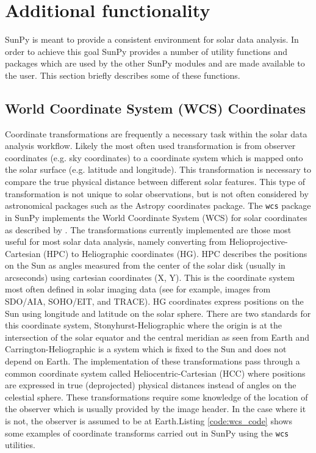 \section{Additional functionality}\label{sec:util}
SunPy is meant to provide a consistent environment for solar data analysis. In 
order to achieve this goal SunPy provides a number of utility functions and packages which 
are used by the other SunPy modules and are made available to the user. This section 
briefly describes some of these functions.

	
\subsection{World Coordinate System (WCS) Coordinates}\label{ssec:util:wcs}
Coordinate transformations are frequently a necessary task within the solar 
data analysis workflow. Likely the most often used transformation is from 
observer coordinates (e.g. sky coordinates) to a coordinate system which is 
mapped onto the solar surface (e.g. latitude and longitude). This 
transformation is necessary to compare the true physical distance between 
different solar features. This type of transformation is not unique
to solar observations, but is not often considered by astronomical packages
such as the Astropy 
coordinates package. The \verb|wcs| package in SunPy implements the World Coordinate 
System (WCS) for solar coordinates as described by \cite{Thompson2000}. The 
transformations currently implemented are those most useful 
for most solar data analysis, namely converting from Helioprojective-Cartesian 
(HPC) to Heliographic coordinates (HG). HPC describes the positions on 
the Sun as angles measured from the center of the solar disk (usually in 
arcseconds) using cartesian coordinates (X, Y). This is the coordinate system 
most often defined in solar imaging data (see for example, images from SDO/AIA, SOHO/EIT, and TRACE). 
HG coordinates express positions on the Sun using longitude and latitude on 
the solar sphere. There are two standards for this coordinate system, 
Stonyhurst-Heliographic where the origin is at the intersection of the solar 
equator and the central meridian as seen from Earth and 
Carrington-Heliographic is a system which is fixed to the Sun and does not depend on Earth. The 
implementation of these transformations pass through a common coordinate system 
called Heliocentric-Cartesian (HCC) where positions are expressed in true 
(deprojected) physical distances instead of angles on the celestial sphere.
These transformations require some knowledge of the location of the observer 
which is usually provided by the image header. In the case where it is 
not, the observer is assumed to be at Earth.Listing \ref{code:wcs_code} shows some examples of coordinate transforms carried out in SunPy using the \verb|wcs| utilities. 

